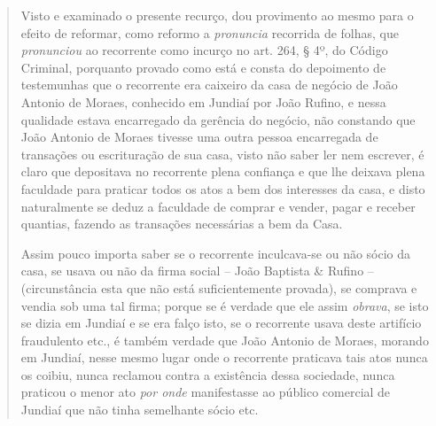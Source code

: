 \begin{quote}
Visto e examinado o presente recurço, dou provimento ao mesmo para o
efeito de reformar, como reformo a \emph{pronuncia} recorrida de folhas,
que \emph{pronunciou} ao recorrente como incurço no art. 264, § 4º, do
Código Criminal, porquanto provado como está e consta do depoimento de
testemunhas que o recorrente era caixeiro da casa de negócio de João
Antonio de Moraes, conhecido em Jundiaí por João Rufino, e nessa
qualidade estava encarregado da gerência do negócio, não constando que
João Antonio de Moraes tivesse uma outra pessoa encarregada de
transações ou escrituração de sua casa, visto não saber ler nem
escrever, é claro que depositava no recorrente plena confiança e que lhe
deixava plena faculdade para praticar todos os atos a bem dos interesses
da casa, e disto naturalmente se deduz a faculdade de comprar e vender,
pagar e receber quantias, fazendo as transações necessárias a bem da
Casa.

Assim pouco importa saber se o recorrente inculcava-se ou não sócio da
casa, se usava ou não da firma social -- João Baptista \& Rufino --
(circunstância esta que não está suficientemente provada), se comprava e
vendia sob uma tal firma; porque se é verdade que ele assim
\emph{obrava}, se isto se dizia em Jundiaí e se era falço isto, se o
recorrente usava deste artifício fraudulento etc., é também verdade que
João Antonio de Moraes, morando em Jundiaí, nesse mesmo lugar onde o
recorrente praticava tais atos nunca os coibiu, nunca reclamou contra a
existência dessa sociedade, nunca praticou o menor ato \emph{por onde}
manifestasse ao público comercial de Jundiaí que não tinha semelhante
sócio etc.


\end{quote}

